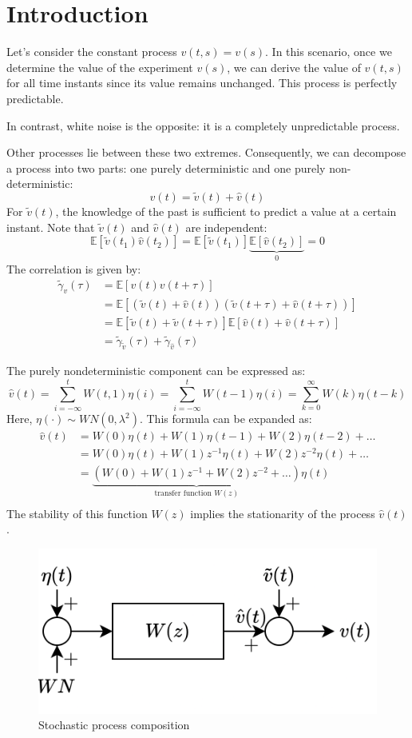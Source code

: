 \section{Introduction}

Let's consider the constant process $v(t,s)=v(s)$. 
In this scenario, once we determine the value of the experiment $v(s)$, we can derive the value of $v(t,s)$ for all time instants since its value remains unchanged.
This process is perfectly predictable.

In contrast, white noise is the opposite: it is a completely unpredictable process. 

Other processes lie between these two extremes.
Consequently, we can decompose a process into two parts: one purely deterministic and one purely non-deterministic:
\[v(t)=\tilde{v}(t)+\widehat{v}(t)\]
For $\tilde{v}(t)$, the knowledge of the past is sufficient to predict a value at a certain instant.
Note that $\tilde{v}(t)$ and $\widehat{v}(t)$ are independent: 
\[\mathbb{E}\left[ \tilde{v}(t_1)\widehat{v}(t_2) \right]=\mathbb{E}\left[ \tilde{v}(t_1)\right]\underbrace{\mathbb{E}\left[\widehat{v}(t_2) \right]}_0 =0\]
The correlation is given by:
\begin{align*}
    \tilde{\gamma}_v(\tau)  &=\mathbb{E}\left[v(t)v(t+\tau)\right] \\
                            &=\mathbb{E}\left[\left(\tilde{v}(t)+\widehat{v}(t)\right)\left(\tilde{v}(t+\tau)+\widehat{v}(t+\tau)\right)\right] \\
                            &=\mathbb{E}\left[\tilde{v}(t)+\tilde{v}(t+\tau)\right]\mathbb{E}\left[\widehat{v}(t)+\widehat{v}(t+\tau)\right] \\
                            &=\tilde{\gamma}_{\tilde{v}}(\tau)+\tilde{\gamma}_{\widehat{v}}(\tau)
\end{align*}

The purely nondeterministic component can be expressed as:
\[\widehat{v}(t)=\sum_{i=-\infty}^{t}W(t,1)\eta(i)=\sum_{i=-\infty}^{t}W(t-1)\eta(i)=\sum_{k=0}^\infty W(k)\eta(t-k)\]
Here, $\eta(\cdot) \sim WN(0,\lambda^2)$. 
This formula can be expanded as:
\begin{align*}
\widehat{v}(t)  &= W(0)\eta(t) + W(1)\eta(t-1) + W(2)\eta(t-2) + \dots \\
                &= W(0)\eta(t) + W(1)z^{-1}\eta(t) + W(2)z^{-2}\eta(t) + \dots \\
                &= \underbrace{\left(W(0) + W(1)z^{-1} + W(2)z^{-2} + \dots\right)}_{\text{transfer function }W(z)} \eta(t)  \\
\end{align*}
The stability of this function $W(z)$ implies the stationarity of the process $\widehat{v}(t)$.
\begin{figure}[H]
    \centering
    \includegraphics[width=0.4\linewidth]{images/dynamic.png} 
    \caption{Stochastic process composition}
\end{figure}
